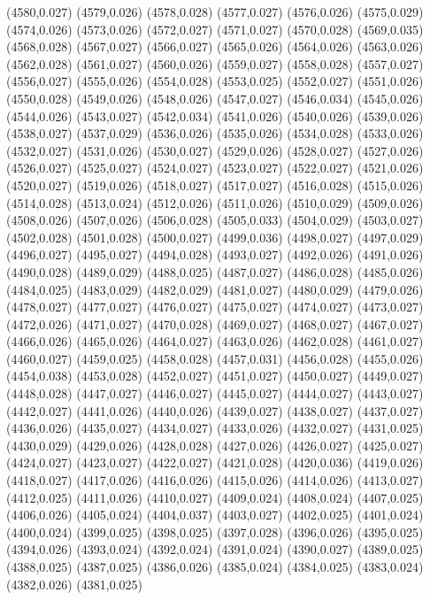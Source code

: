 (4580,0.027)
(4579,0.026)
(4578,0.028)
(4577,0.027)
(4576,0.026)
(4575,0.029)
(4574,0.026)
(4573,0.026)
(4572,0.027)
(4571,0.027)
(4570,0.028)
(4569,0.035)
(4568,0.028)
(4567,0.027)
(4566,0.027)
(4565,0.026)
(4564,0.026)
(4563,0.026)
(4562,0.028)
(4561,0.027)
(4560,0.026)
(4559,0.027)
(4558,0.028)
(4557,0.027)
(4556,0.027)
(4555,0.026)
(4554,0.028)
(4553,0.025)
(4552,0.027)
(4551,0.026)
(4550,0.028)
(4549,0.026)
(4548,0.026)
(4547,0.027)
(4546,0.034)
(4545,0.026)
(4544,0.026)
(4543,0.027)
(4542,0.034)
(4541,0.026)
(4540,0.026)
(4539,0.026)
(4538,0.027)
(4537,0.029)
(4536,0.026)
(4535,0.026)
(4534,0.028)
(4533,0.026)
(4532,0.027)
(4531,0.026)
(4530,0.027)
(4529,0.026)
(4528,0.027)
(4527,0.026)
(4526,0.027)
(4525,0.027)
(4524,0.027)
(4523,0.027)
(4522,0.027)
(4521,0.026)
(4520,0.027)
(4519,0.026)
(4518,0.027)
(4517,0.027)
(4516,0.028)
(4515,0.026)
(4514,0.028)
(4513,0.024)
(4512,0.026)
(4511,0.026)
(4510,0.029)
(4509,0.026)
(4508,0.026)
(4507,0.026)
(4506,0.028)
(4505,0.033)
(4504,0.029)
(4503,0.027)
(4502,0.028)
(4501,0.028)
(4500,0.027)
(4499,0.036)
(4498,0.027)
(4497,0.029)
(4496,0.027)
(4495,0.027)
(4494,0.028)
(4493,0.027)
(4492,0.026)
(4491,0.026)
(4490,0.028)
(4489,0.029)
(4488,0.025)
(4487,0.027)
(4486,0.028)
(4485,0.026)
(4484,0.025)
(4483,0.029)
(4482,0.029)
(4481,0.027)
(4480,0.029)
(4479,0.026)
(4478,0.027)
(4477,0.027)
(4476,0.027)
(4475,0.027)
(4474,0.027)
(4473,0.027)
(4472,0.026)
(4471,0.027)
(4470,0.028)
(4469,0.027)
(4468,0.027)
(4467,0.027)
(4466,0.026)
(4465,0.026)
(4464,0.027)
(4463,0.026)
(4462,0.028)
(4461,0.027)
(4460,0.027)
(4459,0.025)
(4458,0.028)
(4457,0.031)
(4456,0.028)
(4455,0.026)
(4454,0.038)
(4453,0.028)
(4452,0.027)
(4451,0.027)
(4450,0.027)
(4449,0.027)
(4448,0.028)
(4447,0.027)
(4446,0.027)
(4445,0.027)
(4444,0.027)
(4443,0.027)
(4442,0.027)
(4441,0.026)
(4440,0.026)
(4439,0.027)
(4438,0.027)
(4437,0.027)
(4436,0.026)
(4435,0.027)
(4434,0.027)
(4433,0.026)
(4432,0.027)
(4431,0.025)
(4430,0.029)
(4429,0.026)
(4428,0.028)
(4427,0.026)
(4426,0.027)
(4425,0.027)
(4424,0.027)
(4423,0.027)
(4422,0.027)
(4421,0.028)
(4420,0.036)
(4419,0.026)
(4418,0.027)
(4417,0.026)
(4416,0.026)
(4415,0.026)
(4414,0.026)
(4413,0.027)
(4412,0.025)
(4411,0.026)
(4410,0.027)
(4409,0.024)
(4408,0.024)
(4407,0.025)
(4406,0.026)
(4405,0.024)
(4404,0.037)
(4403,0.027)
(4402,0.025)
(4401,0.024)
(4400,0.024)
(4399,0.025)
(4398,0.025)
(4397,0.028)
(4396,0.026)
(4395,0.025)
(4394,0.026)
(4393,0.024)
(4392,0.024)
(4391,0.024)
(4390,0.027)
(4389,0.025)
(4388,0.025)
(4387,0.025)
(4386,0.026)
(4385,0.024)
(4384,0.025)
(4383,0.024)
(4382,0.026)
(4381,0.025)
